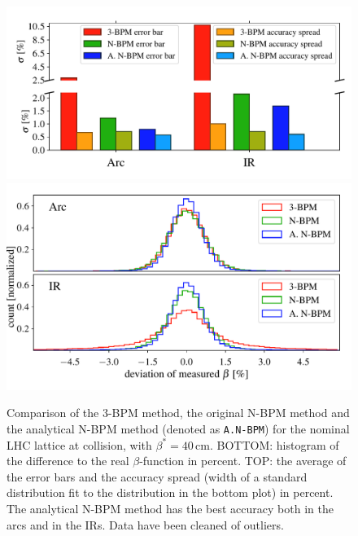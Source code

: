 \begin{figure}
	\centering
    \includegraphics[width=.7\linewidth]{comparison_statistics_007_bars}
    \\
    \includegraphics[width=.7\linewidth]{comparison_statistics_006}
	\caption{Comparison of the 3-BPM method, the original N-BPM method and the analytical N-BPM method (denoted as \texttt{A.N-BPM}) for the nominal LHC lattice at collision, with $ \beta^*=40\,\text{cm} $. BOTTOM: histogram of the difference to the real $\beta$-function in percent. TOP: the average of the error bars and the accuracy spread (width of a standard distribution fit to the distribution in the bottom plot) in percent.  The analytical N-BPM method has the best accuracy both in the arcs and in the IRs. Data have been cleaned of outliers.}
	\label{fig:compare_NBPM_to_3BPM}
\end{figure}
%
